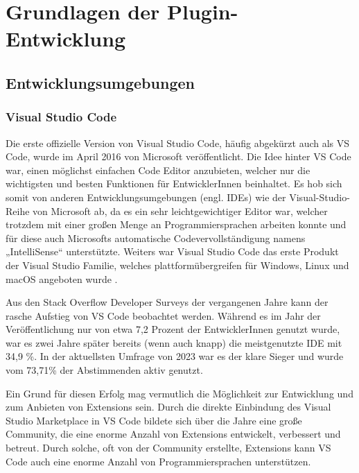 \chapter{Grundlagen der Plugin-Entwicklung}
\label{cha:Grundlagen}

\section{Entwicklungsumgebungen}
\label{sec:Entwicklungsumgebungen}

\subsection{Visual Studio Code}

Die erste offizielle Version von Visual Studio Code, häufig 
abgekürzt auch als VS Code, wurde im April 2016 \cite{VSCodeReleaseDate}
von Microsoft veröffentlicht. Die Idee hinter VS Code
war, einen möglichst einfachen Code Editor anzubieten, 
welcher nur die wichtigsten und besten Funktionen für EntwicklerInnen 
beinhaltet. Es hob sich somit von anderen Entwicklungsumgebungen (engl. IDEs)
wie der Visual-Studio-Reihe von Microsoft ab, da es ein sehr 
leichtgewichtiger Editor war, welcher trotzdem mit einer großen 
Menge an Programmiersprachen arbeiten konnte und für diese auch 
Microsofts automatische Codevervollständigung namens „IntelliSense“ 
unterstützte. Weiters war Visual Studio Code das erste Produkt der Visual 
Studio Familie, welches plattformübergreifen für Windows, Linux und macOS 
angeboten wurde \cite{VSCodePreview}.

Aus den Stack Overflow Developer Surveys\cite{StackOverflowSurvey,StackOverflowSurvey2023}
der vergangenen Jahre kann 
der rasche Aufstieg von VS Code beobachtet werden. Während es im 
Jahr der Veröffentlichung nur von etwa 7,2 Prozent der EntwicklerInnen 
genutzt wurde, war es zwei Jahre später bereits (wenn auch knapp) 
die meistgenutzte IDE mit 34,9 \%. In der aktuellsten Umfrage von 
2023 war es der klare Sieger und wurde vom 73,71\% der Abstimmenden 
aktiv genutzt\cite{StackOverflowSurvey,StackOverflowSurvey2023}.

Ein Grund für diesen Erfolg mag vermutlich die Möglichkeit 
zur Entwicklung und zum Anbieten von Extensions sein. Durch die direkte 
Einbindung des Visual Studio Marketplace in VS Code bildete sich über die 
Jahre eine große Community, die eine enorme Anzahl von Extensions 
entwickelt, verbessert und betreut. Durch solche, oft 
von der Community erstellte, Extensions kann VS Code auch eine 
enorme Anzahl von Programmiersprachen unterstützen.


